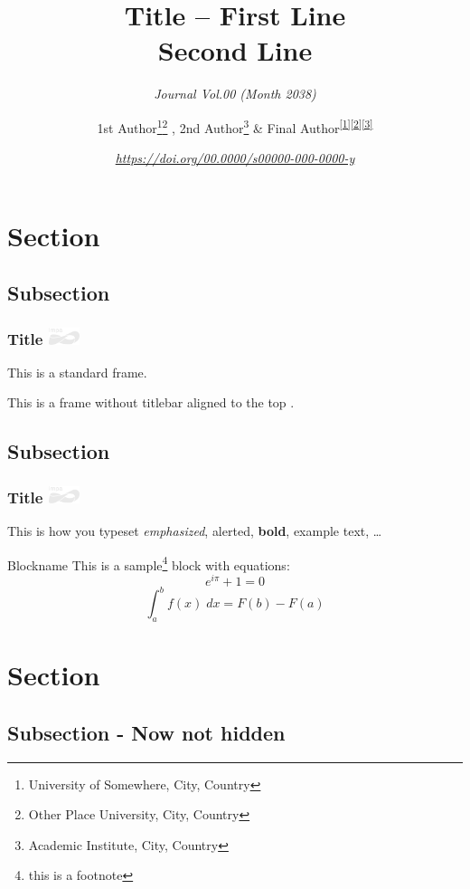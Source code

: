 \documentclass[aspectratio=1610]{beamer}
\title{Title -- First Line\\ 
        Second Line\\}
\subtitle{\textit{Journal Vol.00 (Month 2038)}}
\author{1st Author\footnote
            {\label{1} University of Somewhere, City, Country}\footnote
            {\label{2} Other Place University, City, Country} ,
        2nd Author\footnote
            {\label{3} Academic Institute, City, Country} \& 
        Final Author\textsuperscript{\ref{1}\ref{2}\ref{3}}}
\institute{Presented by:\\ 
            Name and Surname\\
            29$^\text{th}$ February 2038}
\date{\textit{\tiny{\url{https://doi.org/00.0000/s00000-000-0000-y}}}}
\newcommand{\impa}
  {\hfill {\includegraphics[height=0.5cm]{impalogo/impa_logo_light.pdf}}}
\begin{document}
\begin{frame}
  \titlepage
\end{frame}

\section{Section \thesection}
  \subsection{Subsection \thesubsection}
  
    \begin{frame}
      \frametitle{Title \impa}
        This is a standard frame.
    \end{frame}
    
    \begin{frame}[t]
        This is a frame without titlebar aligned to the top .
    \end{frame}
  
  \subsection{Subsection \thesubsection}

    \begin{frame}
      \frametitle{Title \impa}
          This is how you typeset \emph{emphasized}, \alert{alerted}, \textbf{bold}, \textcolor{example}{example text}, \dots
          \vfill
          \begin{block}{Blockname}
            This is a sample\footnote{this is a footnote} block with equations:
              \begin{equation}
                e^{i\pi} + 1 = 0
              \end{equation}
              \begin{equation}
                \int_{a}^{b} f(x) \; dx =  F(b) - F(a)
              \end{equation}
          \end{block}
    \end{frame}
  
\section{Section \thesection}
  \subsection{Subsection \thesubsection - Now not hidden}
  
\end{document}
